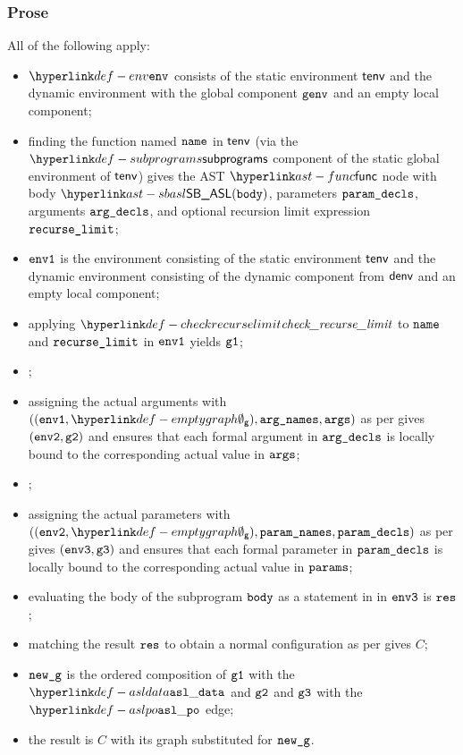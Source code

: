 \subsubsection{Prose}
All of the following apply:
\begin{itemize}
  \item $\env$ consists of the static environment $\textsf{tenv}$ and the dynamic environment with the global
        component $\texttt{genv}$ and an empty local component;
  \item finding the function named $\texttt{name}$ in $\textsf{tenv}$ (via the $\subprograms$ component of the static global environment of $\textsf{tenv}$)
        gives the AST $\func$ node with body
        $\SBASL(\vbody)$, parameters $\texttt{param\_decls}$, arguments $\texttt{arg\_decls}$, and optional recursion limit expression $\texttt{recurse\_limit}$;
  \item $\texttt{env1}$ is the environment consisting of the static environment $\textsf{tenv}$ and the dynamic
        environment consisting of the dynamic component from $\textsf{denv}$ and an empty local component;
  \item applying $\checkrecurselimit$ to $\texttt{name}$ and $\texttt{recurse\_limit}$ in $\texttt{env1}$ yields $\texttt{g1}$\ProseOrError;
  \item {};
  \item assigning the actual arguments with $((\envone, \emptygraph), \argnames, \args)$
        as per  gives $(\texttt{env2}, \texttt{g2})$ and ensures that each
        formal argument in $\texttt{arg\_decls}$ is
        locally bound to the corresponding actual value in $\texttt{args}$;
  \item {};
  \item assigning the actual parameters with $((\envtwo, \emptygraph), \paramnames, \paramdecls)$
        as per  gives $(\texttt{env3}, \texttt{g3})$ and ensures that each
        formal parameter in $\texttt{param\_decls}$ is
        locally bound to the corresponding actual value in $\texttt{params}$;
  \item evaluating the body of the subprogram $\texttt{body}$ as a statement in in $\texttt{env3}$
        is $\texttt{res}$\ProseOrAbnormal;
  \item matching the result $\texttt{res}$ to obtain a normal configuration as per 
        gives $C$;
  \item $\texttt{new\_g}$ is the ordered composition of $\texttt{g1}$ with the $\asldata$ and $\texttt{g2}$ and $\texttt{g3}$ with the $\aslpo$ edge;
  \item the result is $C$ with its graph substituted for $\texttt{new\_g}$.
\end{itemize}


